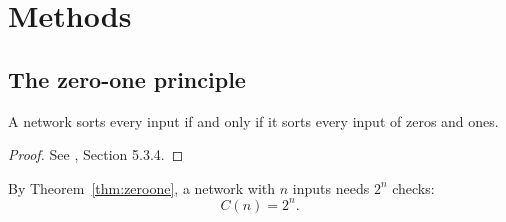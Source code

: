 \chapter{Methods}\label{ch:methods}
\section{The zero-one principle}
\begin{theorem}\label{thm:zeroone}
A network sorts every input if and only if it sorts every input of zeros and ones.
\end{theorem}
\begin{proof}
See \citet{knuth1998}, Section 5.3.4.
\end{proof}

By Theorem~\ref{thm:zeroone}, a network with $n$ inputs needs $2^n$ checks:
\begin{equation}
  C(n) = 2^n.
\end{equation}
